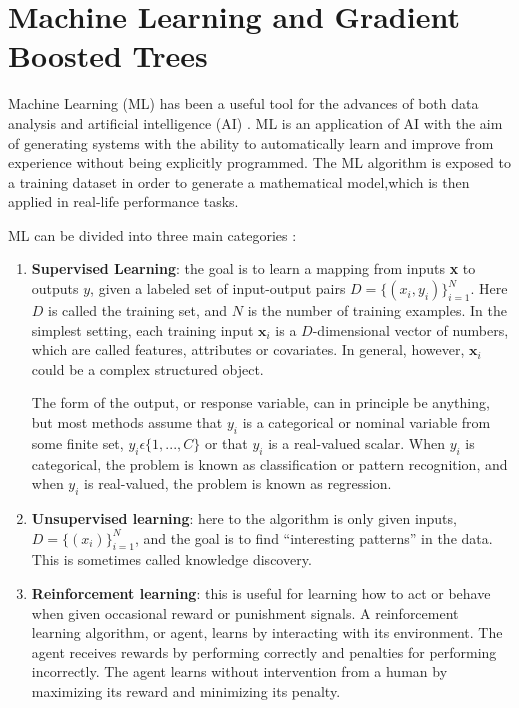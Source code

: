 \documentclass[a4paper, oneside]{book}
\begin{document}
		
		
		
		
	\chapter{Machine Learning and Gradient Boosted Trees}
		Machine Learning (ML) has been a useful tool for the advances of both data analysis and artificial intelligence (AI) \cite{Lifelong ML}. ML is an application of AI with the aim of generating systems with the ability to automatically learn and improve from experience without being explicitly programmed. The ML algorithm is exposed to a training dataset in order to generate a mathematical model,which is then applied in real-life performance tasks. %
		
		ML can be divided into three main categories \cite{ML categories}:
		\begin{enumerate}
			\item \textbf{Supervised Learning}: the goal is to learn a mapping from inputs \textbf{x} to outputs $y$, given a labeled set of input-output pairs $D = \{(x_i, y_i)\}_{i=1}^{N}$. Here $D$ is called the training set, and $N$ is the number of training examples. In the simplest setting, each training input $\textbf{x}_i$ is a $D$-dimensional vector of numbers, which are called features, attributes or covariates. In general, however, $\textbf{x}_i$ could be a complex structured object.
			
			The form of the output, or response variable, can in principle be anything, but most methods assume that $y_i$ is a categorical or nominal variable from some finite set, $y_i \epsilon  \{1, . . . , C\}$ or that $y_i$ is a real-valued scalar. When $y_i$ is categorical, the problem is known as classification or pattern recognition, and when $y_i$ is real-valued, the problem is known as regression.
			
			\item \textbf{Unsupervised learning}: here to the algorithm is only given inputs, $D = \{(x_i)\}_{i=1}^{N}$, and the goal is to find “interesting patterns” in the data. This is sometimes called knowledge discovery. %
			
			\item \textbf{Reinforcement learning}: this is useful for learning how to act or behave when given occasional reward or punishment signals. A reinforcement learning algorithm, or agent, learns by interacting with its environment. The agent receives rewards by performing correctly and penalties for performing incorrectly. The agent learns without intervention from a human by maximizing its reward and minimizing its penalty.
			
		\end{enumerate}
\end{document}
